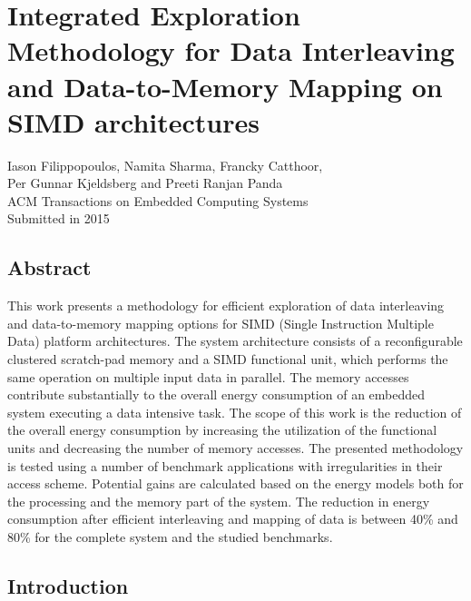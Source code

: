 \chapter{Integrated Exploration Methodology for Data Interleaving and Data-to-Memory Mapping on SIMD architectures}
\label{interleaving}

\begin{center}
Iason Filippopoulos, Namita Sharma, Francky Catthoor, \\ Per Gunnar Kjeldsberg and Preeti Ranjan Panda
\\
ACM Transactions on Embedded Computing Systems
\\
Submitted in 2015
\end{center}
\afterpage{\null\newpage}
\newpage

\vspace*{\fill}
\section*{\hspace*{\fill} Abstract \hspace*{\fill}}
This work presents a methodology for efficient exploration of data interleaving and data-to-memory mapping options for SIMD (Single Instruction Multiple Data) platform architectures.
The system architecture consists of  a reconfigurable clustered scratch-pad memory and a SIMD functional unit, which performs the same operation on multiple input data in parallel. 
The memory accesses contribute substantially to the overall energy consumption of an embedded system executing a data intensive task. 
The scope of this work is the reduction of the overall energy consumption by increasing the utilization of the functional units and decreasing the number of memory accesses.
The presented methodology is tested using a number of benchmark applications with irregularities in their access scheme.
Potential gains are calculated based on the energy models both for the processing and the memory part of the system.
The reduction in energy consumption after efficient interleaving and mapping of data is between 40\% and 80\% for the complete system and the studied benchmarks.
\vspace*{\fill}
\afterpage{\null\newpage}
\newpage

\section{Introduction}

